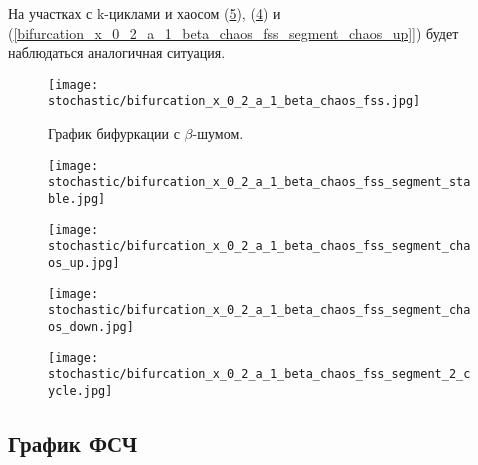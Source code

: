         На участках с k-циклами и хаосом (\ref{bifurcation_x_0_2_a_1_beta_chaos_fss_segment_2_cycle}), (\ref{bifurcation_x_0_2_a_1_beta_chaos_fss_segment_chaos_down}) и (\ref{bifurcation_x_0_2_a_1_beta_chaos_fss_segment_chaos_up]}) будет наблюдаться аналогичная ситуация. 

        \begin{figure}
            \centering
            \texttt{[image: stochastic/bifurcation\_x\_0\_2\_a\_1\_beta\_chaos\_fss.jpg]}
        
            \captionsetup{justification=centering}
            \caption{График бифуркации с \(\beta\)-шумом.}
            \label{bifurcation_x_0_2_a_1_beta_chaos_fss}
        \end{figure}

        \begin{figure}
            \centering
            \texttt{[image: stochastic/bifurcation\_x\_0\_2\_a\_1\_beta\_chaos\_fss\_segment\_stable.jpg]}
        
            \captionsetup{justification=centering}
            \caption{}
            \label{bifurcation_x_0_2_a_1_beta_chaos_fss_segment_stable}
        \end{figure}

        \begin{figure}
            \centering
            \texttt{[image: stochastic/bifurcation\_x\_0\_2\_a\_1\_beta\_chaos\_fss\_segment\_chaos\_up.jpg]}
        
            \captionsetup{justification=centering}
            \caption{}
            \label{bifurcation_x_0_2_a_1_beta_chaos_fss_segment_chaos_up}
        \end{figure}

        \begin{figure}
            \centering
            \texttt{[image: stochastic/bifurcation\_x\_0\_2\_a\_1\_beta\_chaos\_fss\_segment\_chaos\_down.jpg]}
        
            \captionsetup{justification=centering}
            \caption{}
            \label{bifurcation_x_0_2_a_1_beta_chaos_fss_segment_chaos_down}
        \end{figure}

        \begin{figure}
            \centering
            \texttt{[image: stochastic/bifurcation\_x\_0\_2\_a\_1\_beta\_chaos\_fss\_segment\_2\_cycle.jpg]}
        
            \captionsetup{justification=centering}
            \caption{}
            \label{bifurcation_x_0_2_a_1_beta_chaos_fss_segment_2_cycle}
        \end{figure}


    \subsection{График ФСЧ}

        